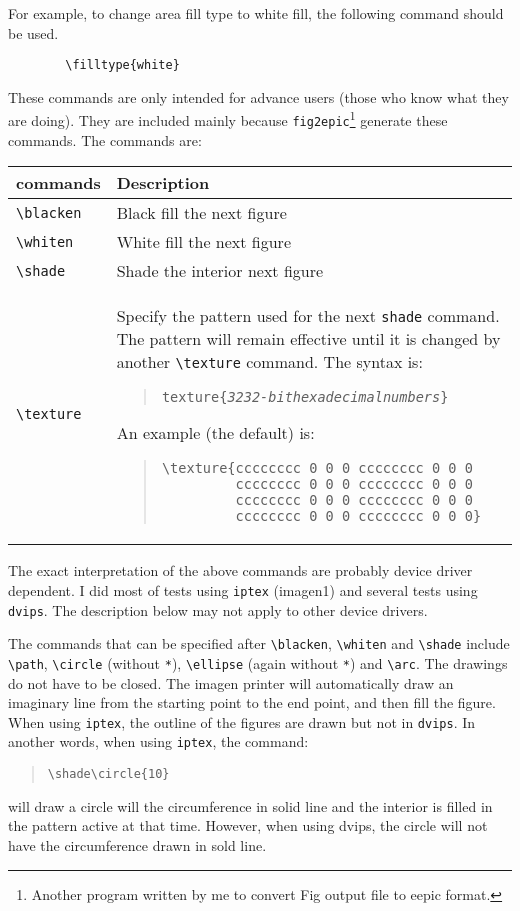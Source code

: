 \documentclass[11pt]{article}
\begin{document}
For example, to change area fill type to white fill, the
following command should be used.
\begin{verbatim}
        \filltype{white}
\end{verbatim}


These commands are only intended for advance users (those who
know what they are doing). They are included mainly because
\verb|fig2epic|\footnote{Another program written by me to convert
Fig output file to eepic format.} generate these commands. The
commands are:
\begin{center}
\begin{tabular}{|l|p{4.4in}|}\hline
\multicolumn{1}{|c|}{commands} & \qquad Description \\ \hline
\verb|\blacken| & Black fill the next figure \\
\verb|\whiten| & White fill the next figure \\
\verb|\shade| & Shade the interior next figure \\
\verb|\texture| & Specify the pattern used for the next
\verb|shade| command. The pattern will remain effective until it is
changed by another \verb|\texture| command.
The syntax is:
\begin{quote}
\begin{alltt}
\BS{}texture\{{\em 32 32-bit hexadecimal numbers}\}
\end{alltt}
\end{quote}
An example (the default) is:
\begin{quote}
\begin{verbatim}
\texture{cccccccc 0 0 0 cccccccc 0 0 0 
         cccccccc 0 0 0 cccccccc 0 0 0 
         cccccccc 0 0 0 cccccccc 0 0 0 
         cccccccc 0 0 0 cccccccc 0 0 0}
\end{verbatim} 
\end{quote} \\
\hline
\end{tabular}
\end{center}
The exact interpretation of the above commands are probably
device driver dependent. I did most of tests using \verb|iptex|
(imagen1) and several tests using \verb|dvips|. 
The description below may not apply to other
device drivers.

The commands that can be specified after \verb|\blacken|,
\verb|\whiten| and \verb|\shade| include \verb|\path|,
\verb|\circle| (without \verb|*|), \verb|\ellipse| (again without
\verb|*|) and \verb|\arc|. The drawings do not have to be closed.
The imagen printer will automatically draw an imaginary line from
the starting point to the end point, and then fill the figure.
When using \verb|iptex|, the outline of the figures are drawn but not
in \verb|dvips|. In another words, when using \verb|iptex|, the command:
\begin{quote}
\begin{verbatim}
\shade\circle{10}
\end{verbatim}
\end{quote}
will draw a circle will the circumference in solid line and the
interior is filled in the pattern active at that time. However, when using
dvips, the circle will not have the circumference drawn in sold line.
\end{document}
